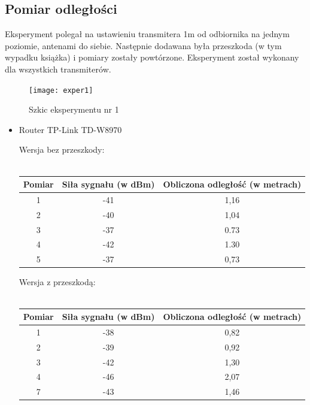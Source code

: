 \subsection{Pomiar odległości}
Eksperyment polegał na ustawieniu transmitera 1m od odbiornika na jednym poziomie, antenami do siebie. Następnie dodawana była przeszkoda (w tym wypadku książka) i pomiary zostały powtórzone. Eksperyment został wykonany dla wszystkich transmiterów.\\			
\begin{figure}	
	\centering			
	\caption{Szkic eksperymentu nr 1}
	\texttt{[image: exper1]}
\end{figure}
\begin{itemize}
	\item Router TP-Link TD-W8970
	\begin{center}
		\begin{minipage}{\linewidth}
			Wersja bez przeszkody:\\\\
			\begin{tabular}{|c|c|c|}
				\hline 
				Pomiar & Siła sygnału (w dBm) & Obliczona odległość (w metrach) \\ 
				\hline 
				1 & -41 & 1,16 \\ 
				\hline 
				2 & -40 & 1,04 \\ 
				\hline 
				3 & -37 & 0.73 \\ 
				\hline 
				4 & -42 & 1.30 \\ 
				\hline 
				5 & -37 & 0,73 \\ 
				\hline 
			\end{tabular} 
		\end{minipage} 
	\end{center}
	\begin{center}
		\begin{minipage}{\linewidth}
			Wersja z przeszkodą:\\\\
			\begin{tabular}{|c|c|c|}
				\hline 
				Pomiar & Siła sygnału (w dBm) & Obliczona odległość (w metrach) \\ 
				\hline 
				1 & -38 & 0,82 \\ 
				\hline 
				2 & -39 & 0,92 \\ 
				\hline 
				3 & -42 & 1,30 \\ 
				\hline 
				4 & -46 & 2,07 \\ 
				\hline 
				7 & -43 & 1,46 \\ 
				\hline 
			\end{tabular}				

\end{minipage}
\end{center}
\end{itemize}

